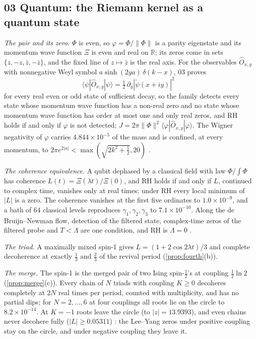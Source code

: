 \documentclass[11pt]{article}
\theoremstyle{definition}\newtheorem{definition}[theorem]{Definition}
\theoremstyle{remark}\newtheorem{remark}[theorem]{Remark}
\newcommand{\R}{\mathbb R}\newcommand{\C}{\mathbb C}\newcommand{\N}{\mathbb N}
\begin{document}
\subsection{03 Quantum: the Riemann kernel as a quantum state}\label{sec:f03}
\emph{The pair and its zero.} $\Phi$ is even, so $\varphi=\Phi/\|\Phi\|$ is a parity eigenstate and its momentum wave function $\Xi$ is even and real on $\R$; its zeros come in sets $\{z,-z,\bar z,-\bar z\}$, and the fixed line of $z\mapsto\bar z$ is the real axis. For the observables $\hat O_{x,y}$ with nonnegative Weyl symbol $a\sinh(2ya)\,\delta(k-x)$, 03 proves
\[
\langle\psi|\hat O_{x,y}|\psi\rangle=\tfrac12\,\partial_y|\tilde\psi(x+iy)|^2
\]
for every real even or odd state of sufficient decay, so the family detects every state whose momentum wave function has a non-real zero and no state whose momentum wave function has order at most one and only real zeros, and RH holds if and only if $\varphi$ is not detected; $J=2\pi\|\Phi\|^2\langle\varphi|\hat O_{x,y}|\varphi\rangle$. The Wigner negativity of $\varphi$ carries $4.844\times10^{-5}$ of the mass and is confined, at every momentum, to $2\pi e^{2|a|}<\max(\sqrt{2k^2+\frac12},20)$ \cite{SQuant}.

\emph{The coherence equivalence.} A qubit dephased by a classical field with law $\Phi/\int\Phi$ has coherence $L(t)=\Xi(\lambda t)/\Xi(0)$, and RH holds if and only if $L$, continued to complex time, vanishes only at real times; under RH every local minimum of $|L|$ is a zero. The coherence vanishes at the first five ordinates to $1.0\times10^{-9}$, and a bath of $64$ classical levels reproduces $\gamma_1,\gamma_2,\gamma_3$ to $7.1\times10^{-10}$. Along the de Bruijn--Newman flow, detection of the filtered state, complex-time zeros of the filtered probe and $T<\Lambda$ are one condition, and RH is $\Lambda=0$ \cite{SQuant}.

\emph{The triad.} A maximally mixed spin-1 gives $L=(1+2\cos2\lambda t)/3$ and complete decoherence at exactly $\frac13$ and $\frac23$ of the revival period (\cref{prop:fourth}(b)).

\emph{The merge.} The spin-1 is the merged pair of two Ising spin-$\frac12$'s at coupling $\frac12\ln2$ (\cref{prop:merge}(c)). Every chain of $N$ triads with coupling $K\ge0$ decoheres completely at $2N$ real times per period, counted with multiplicity, and has no partial dips; for $N=2,\dots,6$ at four couplings all roots lie on the circle to $8.2\times10^{-14}$. At $K=-1$ roots leave the circle (to $|z|=13.9393$), and even chains never decohere fully ($|L|\ge0.05311$) \cite{SQuant}: the Lee--Yang zeros under positive coupling stay on the circle, and under negative coupling they leave it.
\end{document}
